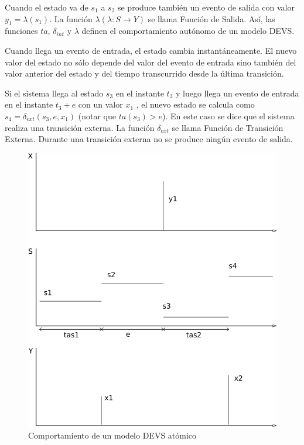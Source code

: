 	Cuando el estado va de $s_1$ a $s_2$ se produce también un evento de salida con valor $y_1 = \lambda(s_1)$. La función $\lambda (\lambda : S \to Y )$ se 
	llama Función de Salida. Así, las funciones $ta$, $\delta_{int}$ y $\lambda$ definen el comportamiento autónomo de un modelo DEVS.

	Cuando llega un evento de entrada, el estado cambia instantáneamente. El nuevo valor del estado no sólo depende del valor del evento de entrada sino 
	también del valor anterior del estado y del tiempo transcurrido desde la última transición.

	Si el sistema llega al estado $s_3$ en el instante $t_3$ y luego llega un evento de entrada en el instante $t_3 + e$ con un valor $x_1$ , el nuevo estado 
	se calcula como $s_4 = \delta_{ext} (s_3 , e, x_1 )$ (notar que $ta(s_3 ) > e$). En este caso se dice que el sistema realiza una transición externa. 
	La función $\delta_{ext}$ se llama Función de Transición Externa. Durante una transición externa no se produce ningún evento de salida.

	\begin{figure}[!htbp]
	  \includegraphics[scale=0.5]{devs-atomic}
	  \caption{Comportamiento de un modelo DEVS atómico}
	   \label{fig:fig2-5}
	\end{figure}

